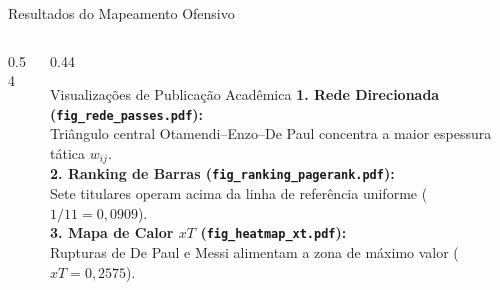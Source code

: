 \documentclass[aspectratio=1610,10pt]{beamer}
\begin{document}
\begin{frame}{Resultados do Mapeamento Ofensivo}
\begin{columns}[T,onlytextwidth]
\begin{column}{0.54\textwidth}
\begin{tabularx}{\linewidth}{c X c c}
        \bottomrule
      \end{tabularx}
    \end{column}
    \begin{column}{0.44\textwidth}
      \begin{block}{Visualizações de Publicação Acadêmica}
        \centering
        \textbf{1. Rede Direcionada (\texttt{fig\_rede\_passes.pdf}):}\\
        Triângulo central Otamendi--Enzo--De Paul concentra a maior espessura tática $w_{ij}$.\\[0.15cm]
        \textbf{2. Ranking de Barras (\texttt{fig\_ranking\_pagerank.pdf}):}\\
        Sete titulares operam acima da linha de referência uniforme ($1/11 = 0{,}0909$).\\[0.15cm]
        \textbf{3. Mapa de Calor $xT$ (\texttt{fig\_heatmap\_xt.pdf}):}\\
        Rupturas de De Paul e Messi alimentam a zona de máximo valor ($xT = 0{,}2575$).
      \end{block}
    \end{column}
  \end{columns}
\end{frame}
\end{document}
